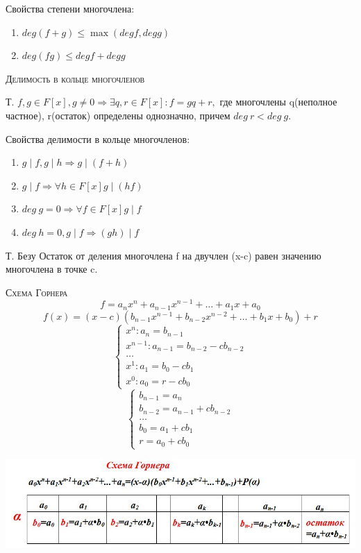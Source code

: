 \documentclass{article}
\begin{document}
Свойства степени многочлена:
\begin{enumerate}
    \item $deg (f+g)\leq \max(deg f, deg g)$
    \item $deg (fg)\leq deg f+deg g$
\end{enumerate}

\textsc{Делимость в кольце многочленов}

Т. $f, g\in F[x], g\neq 0\Rightarrow\exists q, r\in F[x]\colon f=gq+r,$ где многочлены q(неполное частное), r(остаток) определены однозначно, причем $deg\ r<deg\ g$.

Свойства делимости в кольце многочленов:
\begin{enumerate}
    \item $g\mid f, g\mid h \Rightarrow g\mid (f+h)$
    \item $g\mid f\Rightarrow \forall h\in F[x] g\mid (hf)$
    \item $deg\ g=0\Rightarrow \forall f\in F[x] g\mid f$
    \item $deg\ h=0, g\mid f\Rightarrow (gh)\mid f$
\end{enumerate}

Т. Безу Остаток от деления многочлена f на двучлен (x-c) равен значению многочлена в точке c.

\textsc{Схема Горнера}
$$f=a_nx^n+a_{n-1}x^{n-1}+\dots+a_1x+a_0$$
$$f(x)=(x-c)(b_{n-1}x^{n-1}+b_{n-2}x^{n-2}+\dots+b_1x+b_0)+r$$
\begin{equation*}
    \begin{cases}
        x^n: a_n=b_{n-1} \\
        x^{n-1}: a_{n-1}=b_{n-2}-cb_{n-2} \\
        \dots \\
        x^1: a_1=b_0-cb_1 \\
        x^0: a_0=r-cb_0
    \end{cases}
\end{equation*}
\begin{equation*}
    \begin{cases}
        b_{n-1}=a_n \\
        b_{n-2}=a_{n-1}+cb_{n-2} \\
        \dots \\
        b_0=a_1+cb_1 \\
        r=a_0+cb_0
    \end{cases}
\end{equation*}

\centerline{\includegraphics[width=0.7\linewidth]{gr62.jpeg}}
\end{document}
